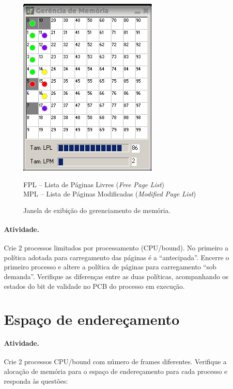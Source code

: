 \documentclass[11pt,a4paper]{article}
\begin{document}
\begin{figure}[h]
  \begin{minipage}[h]{.45\linewidth}
    \includegraphics[scale=.575]{../img/sosim-mm.png}
  \end{minipage}
  \begin{minipage}[h]{.55\linewidth}
    \footnotesize
    \noindent FPL -- Lista de Páginas Livres ({\em Free Page List})\\
    \noindent MPL -- Lista de Páginas Modificadas ({\em Modified Page List})
  \end{minipage}
  \label{fig:mm}
  \caption{Janela de exibição do gerenciamento de memória.}
\end{figure}


\paragraph{Atividade.} Crie 2 processos limitados por processamento (CPU/bound).
No primeiro a política adotada para carregamento das páginas é a ``antecipada''.
Encerre o primeiro processo e altere a política de páginas para carregamento 
``sob demanda''. Verifique as diferenças entre as duas políticas, acompanhando 
os estados do bit de validade no PCB do processo em execução.

\section{Espaço de endereçamento}

\paragraph{Atividade.} Crie 2 processos CPU/bound com número de frames
diferentes. Verifique a alocação de memória para o espaço de endereçamento 
para cada processo e responda às questões: 
\end{document}
